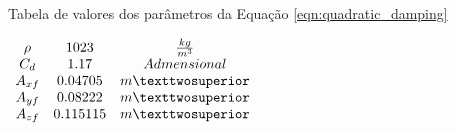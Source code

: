 \begin{table}[H]
	\centering
	\label{tab:quadratic_damping_param_value}
	\caption{Tabela de valores dos parâmetros da Equação \ref{eqn:quadratic_damping}}
	$\begin{array}{c c c}
		\begin{matrix} 
			\rho & 1023 & \frac{kg}{m^{3}} \\ 
			C_d &  1.17 & Admensional \\
			A_{xf} & 0.04705 & m² \\
			A_{yf} & 0.08222 & m² \\
			A_{zf} & 0.115115 & m² 
		\end{matrix}
	\end{array}$
\end{table}


%
